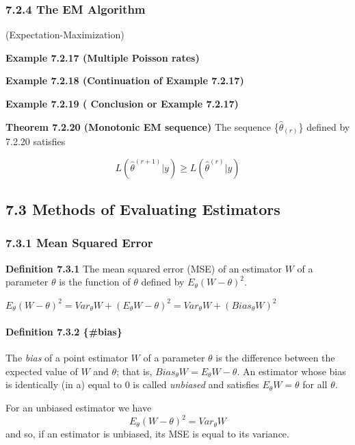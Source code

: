 \documentclass[6pt,twocolumn,Portrait]{article}
\let\oldparagraph\paragraph
\renewcommand{\paragraph}[1]{\oldparagraph{#1}\mbox{}}
\begin{document}
\hypertarget{the-em-algorithm}{%
\subsubsection{7.2.4 The EM Algorithm}\label{the-em-algorithm}}

(Expectation-Maximization)

\textbf{Example 7.2.17 (Multiple Poisson rates)}

\textbf{Example 7.2.18 (Continuation of Example 7.2.17)}

\textbf{Example 7.2.19 ( Conclusion or Example 7.2.17)}

\textbf{Theorem 7.2.20 (Monotonic EM sequence)} The sequence
\{\(\hat\theta_{(r)}\)\} defined by 7.2.20 satisfies

\[L\left(\hat\theta^{(r+1)}|y\right)\ge L\left(\hat\theta^{(r)}|y\right)\]

\hypertarget{methods-of-evaluating-estimators}{%
\subsection{7.3 Methods of Evaluating
Estimators}\label{methods-of-evaluating-estimators}}

\hypertarget{MSE}{%
\subsubsection{7.3.1 Mean Squared Error}\label{MSE}}

\textbf{Definition 7.3.1} The mean squared error (MSE) of an estimator
\(W\) of a parameter \(\theta\) is the function of \(\theta\) defined by
\(E_{\theta}(W-\theta)^2\).

\(E_{\theta}(W-\theta)^2=Var_{\theta}W+(E_{\theta}W-\theta)^2=Var_{\theta}W+(Bias_{\theta}W)^2\)

\hypertarget{unbias}{%
\paragraph{\texorpdfstring{\textbf{Definition 7.3.2}
\{\#bias\}}{Definition 7.3.2 \{\#bias\}}}\label{unbias}}

The \emph{bias} of a point estimator \(W\) of a parameter \(\theta\) is
the difference between the expected value of \(W\) and \(\theta\); that
is, \(Bias_{\theta}W=E_{\theta}W-\theta\). An estimator whose bias is
identically (in a) equal to 0 is called \emph{unbiased} and satisfies
\(E_{\theta}W=\theta\) for all \(\theta\).

For an unbiased estimator we have
\[E_{\theta}(W-\theta)^2=Var_{\theta}W\] and so, if an estimator is
unbiased, its MSE is equal to its variance.
\end{document}
